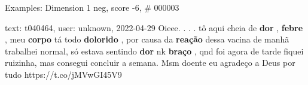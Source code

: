 \begin{frame}{Examples: Dimension 1 neg, score -6, \# 000003}
\footnotesize
\begin{alertblock}{text: t040464, user: unknown, 2022-04-29}
Oieee. . . . tô aqui cheia de \textbf{dor} , \textbf{febre} , meu 
\textbf{corpo} tá todo \textbf{dolorido} , por causa da \textbf{reação} dessa 
vacina \textbf{} de manhã trabalhei normal, só estava 
sentindo \textbf{dor} nk \textbf{braço} , qnd foi agora de tarde fiquei 
ruizinha, mas consegui concluir a semana. Msm doente eu agradeço a Deus por 
tudo   
https://t.co/jMVwGI45V9 
\end{alertblock}
\end{frame}
